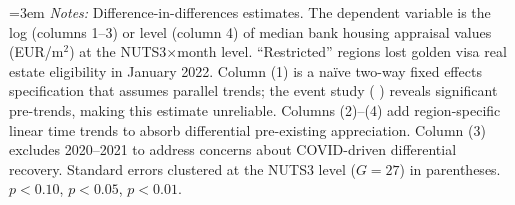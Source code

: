 \begin{table}[htbp]
\centering
\caption{Effect of Golden Visa Geographic Restriction on Housing Appraisal Values}
\label{tab:main}
\vspace{0.5em}
\begin{minipage}{\textwidth}\emergencystretch=3em
\footnotesize
\textit{Notes:} Difference-in-differences estimates. The dependent variable is the log (columns 1--3) or level (column 4) of median bank housing appraisal values (EUR/m$^2$) at the NUTS3$\times$month level. ``Restricted'' regions lost golden visa real estate eligibility in January 2022. Column (1) is a na\"ive two-way fixed effects specification that assumes parallel trends; the event study (
) reveals significant pre-trends, making this estimate unreliable. Columns (2)--(4) add region-specific linear time trends to absorb differential pre-existing appreciation. Column (3) excludes 2020--2021 to address concerns about COVID-driven differential recovery. Standard errors clustered at the NUTS3 level ($G = 27$) in parentheses. \sym{*} $p<0.10$, \sym{**} $p<0.05$, \sym{***} $p<0.01$.
\end{minipage}
\end{table}
